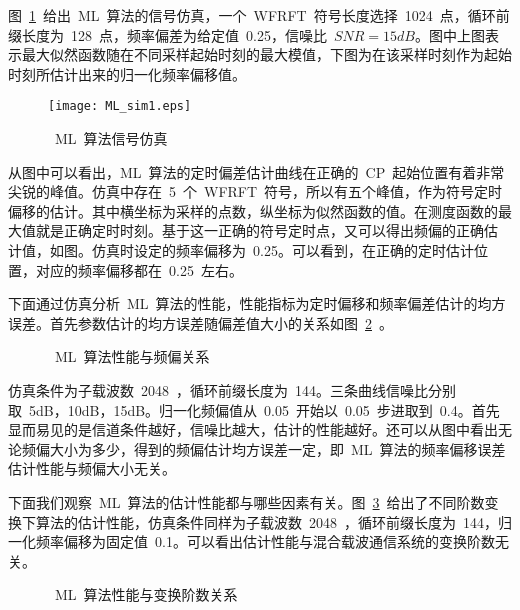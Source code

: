 图~\ref{ML_sim1}~给出~ML~算法的信号仿真，一个~WFRFT~符号长度选择~1024~点，循环前缀长度为~128~点，频率偏差为给定值~0.25，信噪比~$SNR=15dB$。图中上图表示最大似然函数随在不同采样起始时刻的最大模值，下图为在该采样时刻作为起始时刻所估计出来的归一化频率偏移值。
\begin{figure}[htbp]
\centering
\texttt{[image: ML\_sim1.eps]}
\caption{~ML~算法信号仿真}\vspace{-1em}\label{ML_sim1}
\end{figure}
从图中可以看出，ML~算法的定时偏差估计曲线在正确的~CP~起始位置有着非常尖锐的峰值。仿真中存在~5~个~WFRFT~符号，所以有五个峰值，作为符号定时偏移的估计。其中横坐标为采样的点数，纵坐标为似然函数的值。在测度函数的最大值就是正确定时时刻。基于这一正确的符号定时点，又可以得出频偏的正确估
计值，如图。仿真时设定的频率偏移为~0.25。可以看到，在正确的定时估计位置，对应的频率偏移都在~0.25~左右。

下面通过仿真分析~ML~算法的性能，性能指标为定时偏移和频率偏差估计的均方误差。首先参数估计的均方误差随偏差值大小的关系如图~\ref{Performance_by_freqError}~。
\begin{figure}[htbp]
\centering
{}
\caption{~ML~算法性能与频偏关系}\label{Performance_by_freqError}
\vspace{-1em}
\end{figure}
仿真条件为子载波数~2048~，循环前缀长度为~144。三条曲线信噪比分别取~5dB，10dB，15dB。归一化频偏值从~0.05~开始以~0.05~步进取到~0.4。首先显而易见的是信道条件越好，信噪比越大，估计的性能越好。还可以从图中看出无论频偏大小为多少，得到的频偏估计均方误差一定，即~ML~算法的频率偏移误差估计性能与频偏大小无关。

下面我们观察~ML~算法的估计性能都与哪些因素有关。图~\ref{Performance_by_alpha}~给出了不同阶数变换下算法的估计性能，仿真条件同样为子载波数~2048~，循环前缀长度为~144，归一化频率偏移为固定值~0.1。可以看出估计性能与混合载波通信系统的变换阶数无关。
\begin{figure}[htbp]
\centering
{}
\caption{~ML~算法性能与变换阶数关系}\label{Performance_by_alpha}
\vspace{-1em}
\end{figure}

